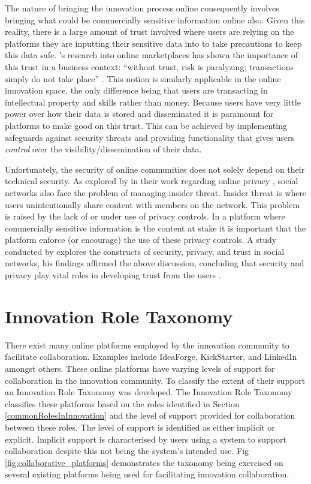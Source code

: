 The nature of bringing the innovation process online consequently involves bringing what could be commercially sensitive information online also. Given this reality, there is a large amount of trust involved where users are relying on the platforms they are inputting their sensitive data into to take precautions to keep this data safe. \citeauthor{boyd2002community}'s research into online marketplaces has shown the importance of this trust in a business context: ``without trust, risk is paralyzing; transactions simply do not take place'' \cite{boyd2002community}. This notion is similarly applicable in the online innovation space, the only difference being that users are transacting in intellectual property and skills rather than money. Because users have very little power over how their data is stored and disseminated it is paramount for platforms to make good on this trust. This can be achieved by implementing safeguards against security threats and providing functionality that gives users {\em control} over the visibility/dissemination of their data.

Unfortunately, the security of online communities does not solely depend on their technical security. As explored by \citeauthor{johnson2012facebook} in their work regarding online privacy \cite{johnson2012facebook}, social networks also face the problem of managing insider threat. Insider threat is where users unintentionally share content with members on the network. This problem is raised by the lack of or under use of privacy controls. In a platform where commercially sensitive information is the content at stake it is important that the platform enforce (or encourage) the use of these privacy controls. A study conducted by \citeauthor{shin2010effects} explores the constructs of security, privacy, and trust in social networks, his findings affirmed the above discussion, concluding that security and privacy play vital roles in developing trust from the users \cite{shin2010effects}.

\section{Innovation Role Taxonomy}

There exist many online platforms employed by the innovation community to facilitate collaboration. Examples include IdeaForge, KickStarter, and LinkedIn amongst others. These online platforms have varying levels of support for collaboration in the innovation community. To classify the extent of their support an Innovation Role Taxonomy was developed. 
The Innovation Role Taxonomy classifies these platforms based on the roles identified in Section \ref{commonRolesInInnovation} and the level of support provided for collaboration between these roles. The level of support is identified as either implicit or explicit. Implicit support is characterised by users using a system to support collaboration despite this not being the system's intended use. Fig \ref{fig:collaborative_platforms} demonstrates the taxonomy being exercised on several existing platforms being used for facilitating innovation collaboration.

